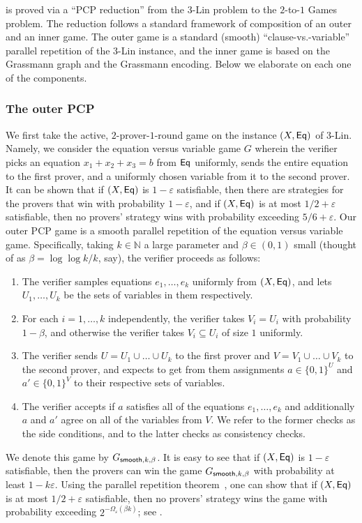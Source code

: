 \documentclass{toc}
\newcommand\eps{\varepsilon}
\def\F{\mathbb{F}}
\begin{document}
\def\F{\mathbb{F}}

 is proved via a ``PCP reduction'' from the $3$-Lin
problem to the $2$-to-$1$ Games problem. The reduction follows a standard
framework of composition of an outer and an inner game. The outer game is a
standard (smooth) ``clause-vs.-variable'' parallel repetition of the 3-Lin
instance, and the inner game is based on the Grassmann graph and the Grassmann encoding.
Below we elaborate on each one of the components.

\subsubsection{The outer PCP}
We first take the active, $2$-prover-$1$-round game on the instance $(X, {\sf Eq})$ of $3$-Lin.
Namely, we consider the equation versus variable game $G$ wherein the verifier picks an equation $x_{1} + x_{2} + x_{3} = b$ from
${\sf Eq}$ uniformly, sends the entire equation to the first prover, and a uniformly chosen variable from it to the second prover.
It can be shown that if $(X, {\sf Eq})$ is $1-\eps$ satisfiable, then there are strategies for the provers that win with probability
$1-\eps$, and if $(X, {\sf Eq})$ is at most $1/2 + \eps$ satisfiable, then no provers' strategy wins with probability exceeding $5/6 +\eps$.
Our outer PCP game is a smooth parallel repetition of the equation versus variable game. Specifically, taking $k\in\mathbb{N}$ a large
parameter and $\beta\in (0,1)$ small (thought of as $\beta = \log\log k/k$, say), the verifier proceeds as follows:
\begin{enumerate}
  \item The verifier samples equations $e_1,\ldots,e_k$ uniformly from $(X, {\sf Eq})$, and lets $U_1,\ldots,U_k$ be the sets
  of variables in them respectively.
  \item For each $i=1,\ldots,k$ independently, the verifier takes $V_i = U_i$ with probability $1-\beta$, and otherwise the
  verifier takes $V_i\subseteq U_i$ of size $1$ uniformly.
  \item The verifier sends $U = U_1\cup\ldots\cup U_k$ to the first prover and $V = V_1\cup\ldots\cup V_k$ to the second prover,
  and expects to get from them assignments $a\in \{0,1\}^U$ and $a'\in \{0,1\}^{V}$ to their respective sets of variables.
  \item The verifier accepts if $a$ satisfies all of the equations $e_1,\ldots,e_k$ and additionally $a$ and $a'$ agree on
  all of the variables from $V$. We refer to the former checks as the side conditions, and to the latter checks as consistency
  checks.
\end{enumerate}
We denote this game by $G_{{\sf smooth}, k, \beta}$.
It is easy to see that if $(X,{\sf Eq})$ is $1-\eps$ satisfiable, then the provers can win the
game $G_{{\sf smooth}, k,\beta}$ with probability at least $1-k\eps$. %
Using the parallel repetition theorem~\cite{Raz98,Holenstein}, one can show that
if $(X, {\sf Eq})$ is at most $1/2+\eps$ satisfiable, then no provers' strategy wins
the game with probability exceeding $2^{-\Omega_{\eps}(\beta k)}$; see .%
%
\end{document}
